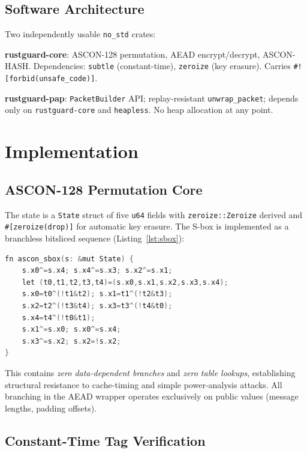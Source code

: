 \documentclass[anonymous]{ndss}
\newcommand{\code}[1]{\mbox{\texttt{#1}}}
\newcommand{\nstd}{\texttt{no\_std}}
\newcommand{\forbid}{\code{\#![forbid(unsafe\_code)]}}
\begin{document}
\subsection{Software Architecture}

Two independently usable \nstd{} crates:

\textbf{rustguard-core}: ASCON-128 permutation, AEAD encrypt/decrypt,
ASCON-HASH. Dependencies: \texttt{subtle} (constant-time), \texttt{zeroize}
(key erasure). Carries \forbid{}.

\textbf{rustguard-pap}: \texttt{PacketBuilder} API; replay-resistant
\texttt{unwrap\_packet}; depends only on \texttt{rustguard-core} and
\texttt{heapless}. No heap allocation at any point.

\section{Implementation}
\label{sec:impl}

\subsection{ASCON-128 Permutation Core}

The state is a \texttt{State} struct of five \texttt{u64} fields with
\code{zeroize::Zeroize} derived and \code{\#[zeroize(drop)]} for
automatic key erasure. The S-box is implemented as a branchless bitsliced
sequence (Listing~\ref{lst:sbox}):

\begin{lstlisting}[language=C, label=lst:sbox,
  caption={Bitsliced ASCON S-box (\texttt{lib.rs}).}]
fn ascon_sbox(s: &mut State) {
    s.x0^=s.x4; s.x4^=s.x3; s.x2^=s.x1;
    let (t0,t1,t2,t3,t4)=(s.x0,s.x1,s.x2,s.x3,s.x4);
    s.x0=t0^(!t1&t2); s.x1=t1^(!t2&t3);
    s.x2=t2^(!t3&t4); s.x3=t3^(!t4&t0);
    s.x4=t4^(!t0&t1);
    s.x1^=s.x0; s.x0^=s.x4;
    s.x3^=s.x2; s.x2=!s.x2;
}
\end{lstlisting}

This contains \emph{zero data-dependent branches} and \emph{zero table
lookups}, establishing structural resistance to cache-timing and simple
power-analysis attacks. All branching in the AEAD wrapper operates
exclusively on public values (message lengths, padding offsets).

\subsection{Constant-Time Tag Verification}
\end{document}
